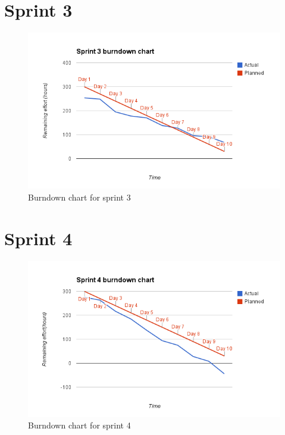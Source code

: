 \section{Sprint 3}
\begin{figure}[H]
\includegraphics[width=\textwidth]{appendix/backlog/burndown3.png}
\caption{Burndown chart for sprint 3}
\end{figure}


\section{Sprint 4}
\begin{figure}[H]
\includegraphics[width=\textwidth]{appendix/backlog/burndown4.png}
\caption{Burndown chart for sprint 4}
\end{figure}



